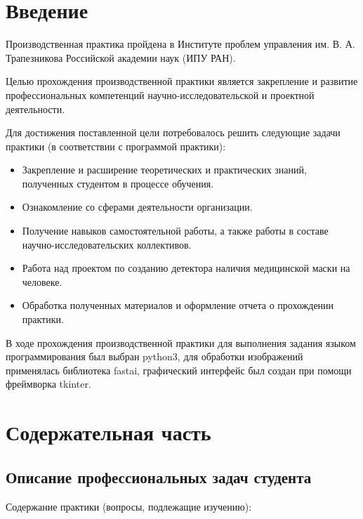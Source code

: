 \documentclass[a4paper,14pt]{article}
\begin{document}
% 
\tableofcontents
\pagebreak

\section{Введение}

Производственная практика пройдена в Институте проблем управления им. В. А. Трапезникова Российской академии наук (ИПУ РАН).

Целью прохождения производственной практики является закрепление и развитие профессиональных компетенций научно-исследовательской и проектной деятельности.

Для достижения поставленной цели потребовалось решить следующие задачи практики (в соответствии с программой практики):
\begin{itemize}
	\item Закрепление и расширение теоретических и практических знаний, полученных студентом в процессе обучения.

	\item Ознакомление со сферами деятельности организации.

	\item Получение навыков самостоятельной работы, а также работы в составе научно-исследовательских коллективов.

	\item Работа над проектом по созданию детектора наличия медицинской маски на человеке.

	\item Обработка полученных материалов и оформление отчета о прохождении практики.
\end{itemize}

В ходе прохождения производственной практики для выполнения задания языком программирования был выбран python3, для обработки изображений применялась библиотека fastai, графический интерфейс был создан при помощи фреймворка tkinter.

\pagebreak
\section{Содержательная часть}

\subsection{Описание профессиональных задач студента}

Содержание практики (вопросы, подлежащие изучению):
\end{document}
